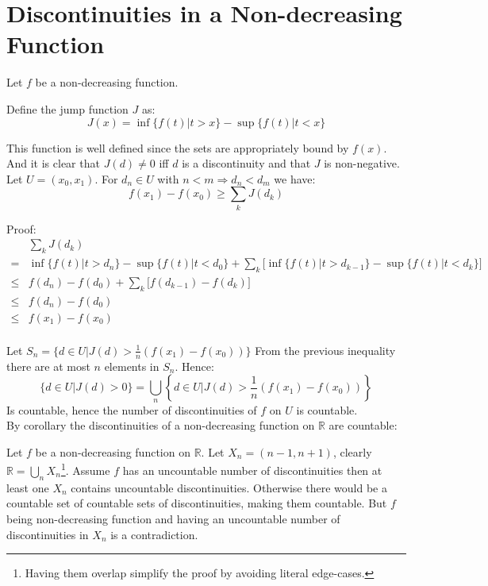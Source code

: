 
\section{Discontinuities in a Non-decreasing Function}

Let $f$ be a non-decreasing function.

Define the jump function $J$ as:
\[ J(x) = \inf\{f(t) | t > x\} - \sup\{f(t) | t < x\}\]

This function is well defined since the sets are appropriately bound by $f(x)$. And it is clear that $J(d) \neq 0$ iff $d$  is a discontinuity and that $J$ is non-negative.
\\

Let $U = (x_0,x_1)$. For $d_n \in U$ with $n < m \Rightarrow d_n < d_m$ we have:
\[f(x_1)-f(x_0) \geq \sum_{k}J(d_k)\]

Proof:
\begin{equation*}
\begin{aligned}
	&\sum_{k}J(d_k) \\
	=& \inf\{f(t) | t > d_n\} - \sup\{f(t) | t < d_0\} + \sum_k\big[\inf\{f(t) | t > d_{k-1}\} - \sup\{f(t) | t < d_k\}\big] \\
	\leq & f(d_n)-f(d_0) + \sum_k\big[f(d_{k-1})-f(d_k)\big] \\
	\leq & f(d_n)-f(d_0)\\
	\leq & f(x_1)-f(x_0)\\
\end{aligned}
\end{equation*}

Let $ S_n = \{d \in U | J(d) > \frac{1}{n}(f(x_1)-f(x_0)) \}$
From the previous inequality there are at most $n$ elements in $S_n$.
Hence:
\[\{d\in U | J(d) > 0\} = \bigcup_{n}\left\{d \in U | J(d) > \frac{1}{n}(f(x_1)-f(x_0))\right\}\]
Is countable, hence the number of discontinuities of $f$ on $U$ is countable.
\\

By corollary the discontinuities of a non-decreasing function on $\mathbb{R}$ are countable:

Let $f$ be a non-decreasing function on $\mathbb{R}$.
Let $X_n = (n-1,n+1)$, clearly $\mathbb{R} = \bigcup_{n}X_n$\footnote{Having them overlap simplify the proof by avoiding literal edge-cases.}.
Assume $f$ has an uncountable number of discontinuities then at least one $X_n$ contains uncountable discontinuities.
Otherwise there would be a countable set of countable sets of discontinuities, making them countable.
But $f$ being non-decreasing function and having an uncountable number of discontinuities in $X_n$ is a contradiction.

